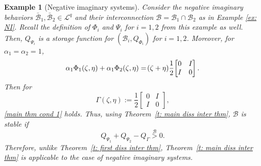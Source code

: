 \documentclass[letterpaper, 10 pt, conference]{ieeeconf}
\theoremstyle{ieeeconf}
\newtheorem{example}{Example}
\newcommand{\B}{\mathcal{B}}
\begin{document}
\begin{example}[Negative imaginary systems]
	Consider the negative imaginary behaviors $\bar{\B}_1, \bar{\B}_2\in \mathcal{L}^q$ and their interconnection $\B =\B_1 \cap \B_2$ as in Example \ref{ex: NI}. 
	Recall the definition of $\Phi_i$ and $\Psi_i$ for $i = 1,2$ from this example as well. Then, $Q_{\Psi_i}$ is a storage function for $(\B_i,Q_{\Phi_i})$ for $i=1,2$. Moreover, for $\alpha_1=\alpha_2=1$,
	\vspace{-0.5ex} \begin{equation*}\alpha_1\Phi_1(\zeta,\eta)+\alpha_1\Phi_2(\zeta,\eta)=\!(\zeta+\eta)\frac{1}{2}\!\begin{bmatrix}
			0 & I \\
			I & 0
		\end{bmatrix}.\vspace{-0.5ex}\end{equation*} Then for
	\vspace{-0.5ex} \[\Gamma(\zeta,\eta):=\frac{1}{2}\begin{bmatrix}
		0 & I \\
		I & 0
	\end{bmatrix},\] \eqref{main thm cond 1} holds. Thus, using Theorem~\ref{t: main diss inter thm}, $\B$ is stable if 
	\vspace{-0.5ex}
	\begin{equation}
		Q_{\Psi_1}+Q_{\Psi_2}-Q_\Gamma \stackrel{\B}{>} 0.
		\label{NI cond}
	\end{equation}
	Therefore, unlike Theorem~\ref{t: first diss inter thm}, Theorem~\ref{t: main diss inter thm} is applicable to the case of negative imaginary systems. 


\end{example}
\end{document}
